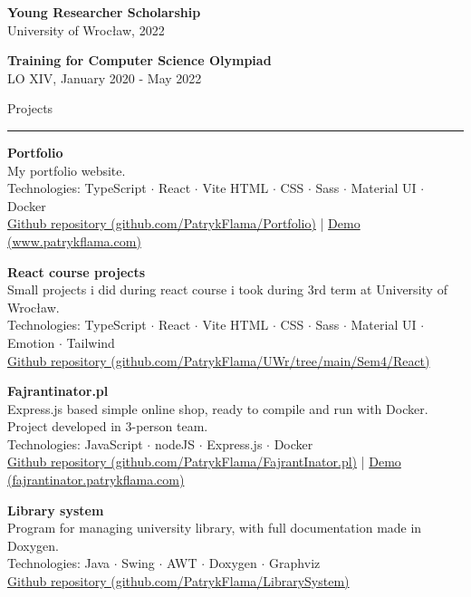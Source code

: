 \documentclass{letter}
\begin{document}
\begin{minipage}[t]{0.70\textwidth}
\begin{tcolorbox}[colback=white, colframe=white, width=\textwidth, boxrule=0pt, sharp corners, height=\textheight, left=5mm, right=5mm, top=5mm, bottom=5mm]
{\vspace{1mm}
\textbf{Young Researcher Scholarship} \\
{\small University of Wrocław, 2022}

\vspace{1mm}
\textbf{Training for Computer Science Olympiad} \\
{\small LO XIV, January 2020 - May 2022}

}


{\large Projects}
\rule{\linewidth}{0.4pt}

{ 

\textbf{Portfolio}  \\
My portfolio website. \\
{\small Technologies: TypeScript $\cdot$ React $\cdot$ Vite 
HTML $\cdot$ CSS $\cdot$ Sass $\cdot$ Material UI $\cdot$ Docker } \\
{\small \href{https://github.com/PatrykFlama/Portfolio}{Github repository (github.com/PatrykFlama/Portfolio)}} 
| {\small \href{https://www.patrykflama.com/}{Demo (www.patrykflama.com)}}

\textbf{React course projects}  \\
Small projects i did during react course i took during 3rd term at University of Wrocław. \\
{\small Technologies: TypeScript $\cdot$ React $\cdot$ Vite 
HTML $\cdot$ CSS $\cdot$ Sass $\cdot$ Material UI $\cdot$ Emotion $\cdot$ Tailwind } \\
{\small \href{https://github.com/PatrykFlama/UWr/tree/main/Sem4/React}{Github repository (github.com/PatrykFlama/UWr/tree/main/Sem4/React)}}

\textbf{Fajrantinator.pl}  \\
Express.js based simple online shop, ready to compile and run with Docker. Project developed in 3-person team. \\
{\small Technologies: JavaScript $\cdot$ nodeJS $\cdot$ Express.js $\cdot$ Docker } \\
{\small \href{https://github.com/PatrykFlama/FajrantInator.pl}{Github repository (github.com/PatrykFlama/FajrantInator.pl)}} 
| {\small \href{https://fajrantinator.patrykflama.com/}{Demo (fajrantinator.patrykflama.com)}}

\textbf{Library system}  \\
Program for managing university library, with full documentation made in Doxygen. \\
{\small Technologies: Java $\cdot$ Swing $\cdot$ AWT $\cdot$ Doxygen $\cdot$ Graphviz } \\
{\small \href{https://github.com/PatrykFlama/LibrarySystem}{Github repository (github.com/PatrykFlama/LibrarySystem)}}

}
\end{tcolorbox}
\end{minipage}
\end{document}
